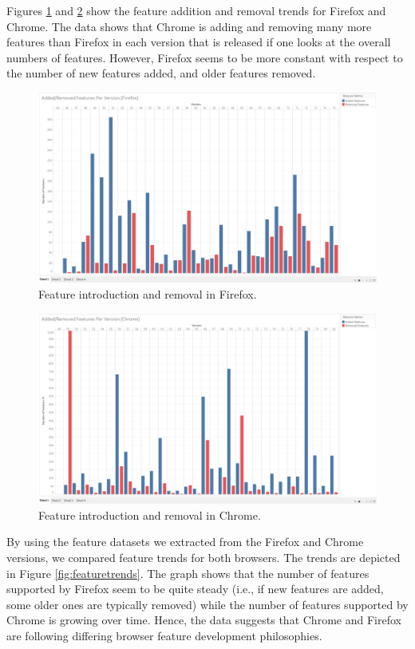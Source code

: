   Figures \ref{fig:ffaddremove} and \ref{fig:chaddremove} show the
  feature addition and removal trends for Firefox and Chrome. The data
  shows that Chrome is adding and removing many more features than
  Firefox in each version that is released if one looks at the overall
  numbers of features. However, Firefox seems to be more constant with
  respect to the number of new features added, and older features
  removed.

\begin{figure}[ht]
    \centering
    \includegraphics[width=\columnwidth]{figures/Firefox-add-remove.png}
    \caption{Feature introduction and removal in Firefox.}
    \label{fig:ffaddremove}
\end{figure}

\begin{figure}[ht]
    \centering
    \includegraphics[width=\columnwidth]{figures/Chrome-add-remove.png}
    \caption{Feature introduction and removal in Chrome.}
    \label{fig:chaddremove}
\end{figure}

By using the feature datasets we extracted from the Firefox and Chrome
versions, we compared feature trends for both browsers. The trends are
depicted in Figure \ref{fig:featuretrends}. The graph shows that the
  number of features supported by Firefox seem to be quite steady
  (i.e., if new features are added, some older ones are typically
  removed) while the number of features supported by Chrome is growing
  over time. Hence, the data suggests that Chrome and Firefox are
  following differing browser feature development philosophies.

